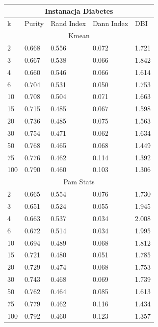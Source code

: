 \documentclass[12pt,a4paper]{article}
\begin{document}
\begin{tabular}{ |p{1.5cm}||p{2.5cm}|p{2.5cm}|p{2.5cm}|p{2.5cm}| }
\hline
\multicolumn{5}{|c|}{Instanacja Diabetes}\\
\hline
k &Purity & Rand Index & Dann Index & DBI \\
\hline
\hline
\multicolumn{5}{|c|}{Kmean}\\
\hline
2 & 0.668 & 0.556 & 0.072 & 1.721\\
3 & 0.667 & 0.538 & 0.066 & 1.842\\
4 & 0.660 & 0.546 & 0.066 & 1.614\\
6 & 0.704 & 0.531 & 0.050 & 1.753\\
10 & 0.708 & 0.504 & 0.071 & 1.663\\
15 & 0.715 & 0.485 & 0.067 & 1.598\\
20 & 0.736 & 0.485 & 0.075 & 1.563\\
30 & 0.754 & 0.471 & 0.062 & 1.634\\
50 & 0.768 & 0.465 & 0.068 & 1.449\\
75 & 0.776 & 0.462 & 0.114 & 1.392\\
100 & 0.790 & 0.460 & 0.103 & 1.306\\
\hline
\multicolumn{5}{|c|}{Pam Stats}\\
\hline
2 & 0.665 & 0.554 & 0.076 & 1.730\\
3 & 0.651 & 0.524 & 0.055 & 1.945\\
4 & 0.663 & 0.537 & 0.034 & 2.008\\
6 & 0.672 & 0.514 & 0.034 & 1.995\\
10 & 0.694 & 0.489 & 0.068 & 1.812\\
15 & 0.721 & 0.480 & 0.051 & 1.785\\
20 & 0.729 & 0.474 & 0.068 & 1.753\\
30 & 0.743 & 0.468 & 0.069 & 1.739\\
50 & 0.762 & 0.464 & 0.085 & 1.613\\
75 & 0.779 & 0.462 & 0.116 & 1.434\\
100 & 0.792 & 0.460 & 0.123 & 1.357\\
\hline
\end{tabular}
\end{document}
